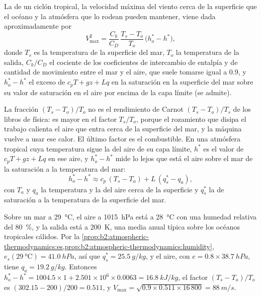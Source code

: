 \begin{proposition}\label{prop:b2:weather-systems:pi}
La \emph{} de un ciclón tropical, la velocidad máxima del viento cerca de la superficie que
el océano y la atmósfera que lo rodean pueden mantener, viene dada aproximadamente por
\[
  V_{\max}^2 = \frac{C_k}{C_D}\,\frac{T_s - T_o}{T_o}\,\bigl(h_o^* - h^*\bigr),
\]
donde $T_s$ es la temperatura de la superficie del mar, $T_o$ la temperatura de la salida, $C_k/C_D$
el cociente de los coeficientes de intercambio de entalpía y de cantidad de movimiento entre el mar y el aire,
que suele tomarse igual a 0.9, y $h_o^* - h^*$ el exceso de $c_pT + gz + Lq$ en la saturación en la superficie
del mar sobre su valor de saturación en el aire por encima de la capa límite (se admite).
\end{proposition}

La fracción $(T_s - T_o)/T_o$ no es el rendimiento de Carnot $(T_s - T_o)/T_s$ de los libros de
física: es mayor en el factor $T_s/T_o$, porque el rozamiento que disipa el trabajo calienta
el aire que entra cerca de la superficie del mar, y la máquina vuelve a usar ese calor. El último
factor es el combustible. En una atmósfera tropical cuya temperatura sigue la  del aire de su
capa límite, $h^*$ es el valor de $c_pT + gz + Lq$ en ese aire, y $h_o^* - h^*$
mide lo lejos que está el aire sobre el mar de la saturación a la temperatura del mar:
\[
  h_o^* - h^* \approx c_p\,(T_s - T_a) + L\,(q_s^* - q_a),
\]
con $T_a$ y $q_a$ la temperatura y la  del aire cerca de la superficie y
$q_s^*$ la  de saturación a la temperatura de la superficie del mar.

\begin{example}\label{ex:b2:weather-systems:pi}
Sobre un mar a \qty{29}{\celsius}, el aire a \qty{1015}{hPa} está a \qty{28}{\celsius} con una
humedad relativa del \qty{80}{\percent}, y la salida está a \qty{200}{K}, una media anual típica
sobre los océanos tropicales cálidos. Por la \cref{prop:b2:atmospheric-thermodynamics:es,prop:b2:atmospheric-thermodynamics:humidity},
$e_s(\qty{29}{\celsius}) = \qty{41.0}{hPa}$, así que $q_s^* = \qty{25.5}{g/kg}$, y el aire, con
$e = 0.8 \times \qty{38.7}{hPa}$, tiene $q_a = \qty{19.2}{g/kg}$. Entonces $h_o^* - h^* = 1004.5 \times
1 + 2.501 \times 10^6 \times 0.0063 = \qty{16.8}{kJ/kg}$, el factor $(T_s - T_o)/T_o$ es
$(302.15 - 200)/200 = 0.511$, y $V_{\max} = \sqrt{0.9 \times 0.511 \times 16\,800} =
\qty{88}{m/s}$.
\end{example}

